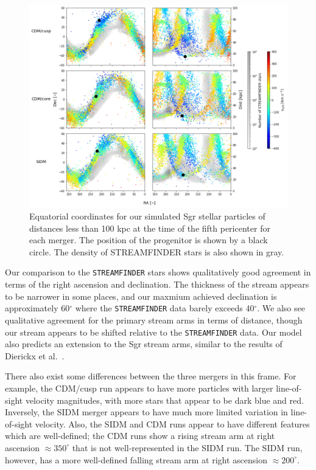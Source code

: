 \begin{figure}
    \centering 
    \includegraphics[width=1.0\linewidth]{figs/equatorial_streamfinder.png}
    \caption{%
        Equatorial coordinates for our simulated Sgr stellar particles of
        distances less than 100 kpc at the time of the fifth pericenter for
        each merger.  The position of the progenitor is shown by a black circle.
        The density of STREAMFINDER stars is also shown in gray.
    }
    \label{fig:equatorial}
\end{figure}

Our comparison to the \verb|STREAMFINDER| stars shows qualitatively good
agreement in terms of the right ascension and declination. The thickness of the
stream appears to be narrower in some places, and our maxmium achieved
declination is approximately 60$^\circ$ where the \verb|STREAMFINDER| data
barely exceeds 40$^\circ$. We also see qualitative agreement for the primary
stream arms in terms of distance, though our stream appears to be shifted
relative to the \verb|STREAMFINDER| data. Our model also predicts an extension
to the Sgr stream arms, similar to the results of Dierickx et
al.~\cite{dierickx_predicted_2017}. 

There also exist some differences between the three mergers in this frame.
For example, the CDM/cusp run appears to have more particles with larger
line-of-sight velocity magnitudes, with more stars that appear to be dark blue
and red.  Inversely, the SIDM merger appears to have much more limited
variation in line-of-sight velocity.  Also, the SIDM and CDM runs appear to
have different features which are well-defined; the CDM runs show a rising
stream arm at right ascension $\approx 350^\circ$ that is not well-represented
in the SIDM run.  The SIDM run, however, has a more well-defined falling
stream arm at right ascension $\approx 200^\circ$.

